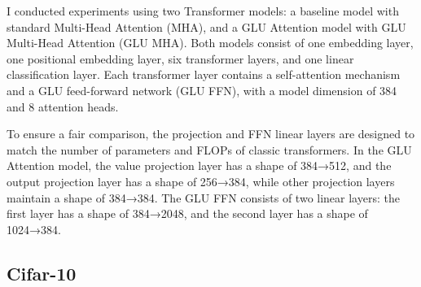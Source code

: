 \documentclass[11pt]{article}
\begin{document}
I conducted experiments using two Transformer models: a baseline model with standard Multi-Head Attention (MHA), and a GLU Attention model with GLU Multi-Head Attention (GLU MHA). Both models consist of one embedding layer, one positional embedding layer, six transformer layers, and one linear classification layer. Each transformer layer contains a self-attention mechanism and a GLU feed-forward network (GLU FFN), with a model dimension of 384 and 8 attention heads.

To ensure a fair comparison, the projection and FFN linear layers are designed to match the number of parameters and FLOPs of classic transformers. In the GLU Attention model, the value projection layer has a shape of 384→512, and the output projection layer has a shape of 256→384, while other projection layers maintain a shape of 384→384. The GLU FFN consists of two linear layers: the first layer has a shape of 384→2048, and the second layer has a shape of 1024→384.

\subsection{Cifar-10}
\end{document}
